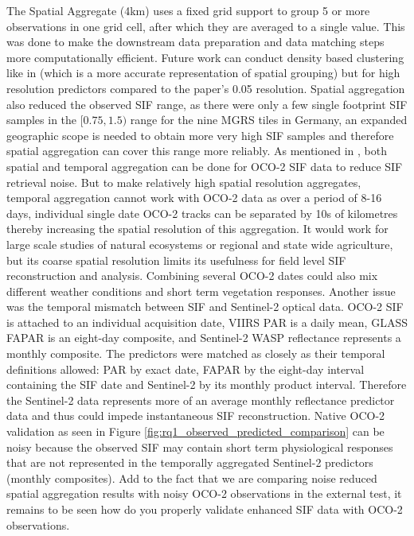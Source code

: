 The Spatial Aggregate (4km) uses a fixed grid support to group 5 or more observations in one grid cell, after which they are averaged to a single value. This was done to make the downstream data preparation and data matching steps more computationally efficient. Future work can conduct density based clustering like in \cite{yu2019high} (which is a more accurate representation of spatial grouping) but for high resolution predictors compared to the paper's 0.05 resolution. Spatial aggregation also reduced the observed SIF range, as there were only a few single footprint SIF samples in the $[0.75,1.5)$ range for the nine MGRS tiles in Germany, an expanded geographic scope is needed to obtain more very high SIF samples and therefore spatial aggregation can cover this range more reliably. As mentioned in \cite{doughty2022global}, both spatial and temporal aggregation can be done for OCO-2 SIF data to reduce SIF retrieval noise. But to make relatively high spatial resolution aggregates, temporal aggregation cannot work with OCO-2 data as over a period of 8-16 days, individual single date OCO-2 tracks can be separated by 10s of kilometres thereby increasing the spatial resolution of this aggregation. It would work for large scale studies of natural ecosystems or regional and state wide agriculture, but its coarse spatial resolution limits its usefulness for field level SIF reconstruction and analysis. Combining several OCO-2 dates could also mix different weather conditions and short term vegetation responses. Another issue was the temporal mismatch between SIF and Sentinel-2 optical data. OCO-2 SIF is attached to an individual acquisition date, VIIRS PAR is a daily mean, GLASS FAPAR is an eight-day composite, and Sentinel-2 WASP reflectance represents a monthly composite. The predictors were matched as closely as their temporal definitions allowed: PAR by exact date, FAPAR by the eight-day interval containing the SIF date and Sentinel-2 by its monthly product interval. Therefore the Sentinel-2 data represents more of an average monthly reflectance predictor data and thus could impede instantaneous SIF reconstruction. Native OCO-2 validation as seen in Figure \ref{fig:rq1_observed_predicted_comparison} can be noisy because the observed SIF may contain short term physiological responses that are not represented in the temporally aggregated Sentinel-2 predictors (monthly composites). Add to the fact that we are comparing noise reduced spatial aggregation results with noisy OCO-2 observations \cite{frankenberg2014prospects} in the external test, it remains to be seen how do you properly validate enhanced SIF data with OCO-2 observations. 

